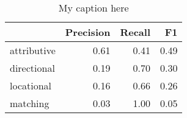 \begin{table}[!ht]
\centering
\begin{tabular}{lrrr}
\toprule
{} &  Precision &  Recall &   F1 \\
\midrule
attributive &       0.61 &    0.41 & 0.49 \\
directional &       0.19 &    0.70 & 0.30 \\
locational  &       0.16 &    0.66 & 0.26 \\
matching    &       0.03 &    1.00 & 0.05 \\
\bottomrule
\end{tabular}
\caption{My caption here}
\label{tab:RELATIONAL-oe-combined-F1}
\end{table}